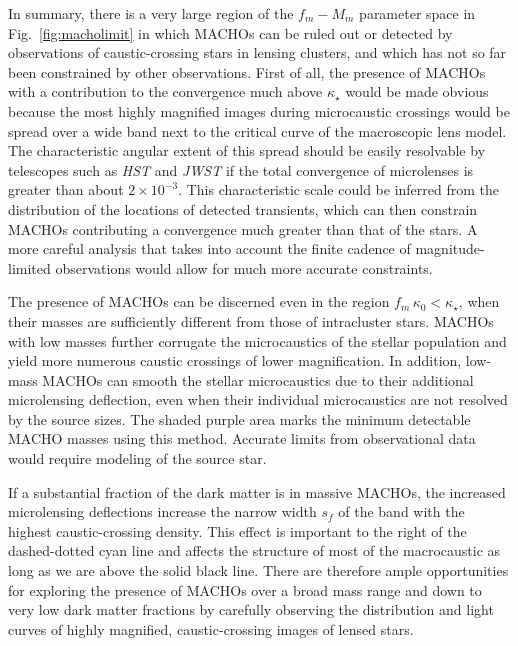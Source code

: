 \documentclass{aastex6}
\newcommand{\reffig}[1]{Fig.~\ref{fig:#1}}
\begin{document}
  In summary, there is a very large region of the $f_m - M_m$
parameter space in \reffig{macholimit} in which MACHOs can be ruled out or
detected by observations of caustic-crossing stars in lensing
clusters, and which has not so far been constrained by other observations.
First of all, the presence of MACHOs with a contribution to the
convergence much above $\kappa_\star$ would be made obvious because the
most highly magnified images during microcaustic crossings would be spread
over a wide band next to the critical curve of the macroscopic lens model. The characteristic angular extent of this spread should be easily resolvable by telescopes such as {\em HST} and {\em JWST} if the total convergence of microlenses is greater than about $2 \times 10^{-3}$. This characteristic scale could be inferred from the distribution of the locations of detected transients, which can then constrain MACHOs contributing a convergence much greater than that of the stars. A more careful analysis that takes into account the finite cadence of magnitude-limited observations would allow for much more accurate constraints.

The presence of MACHOs can be discerned even in the region $f_m\, \kappa_0 < \kappa_\star$, when their masses are sufficiently different from those of intracluster stars. MACHOs with low masses further corrugate the microcaustics of the stellar population and yield more numerous caustic crossings of lower magnification. In addition, low-mass MACHOs can smooth the stellar microcaustics due to their additional microlensing deflection, even when their individual microcaustics are not resolved by the source sizes. The shaded purple area marks the minimum detectable MACHO masses using this method. Accurate limits from observational data would require modeling of the source star.

If a substantial fraction of the dark matter is in massive MACHOs, the increased microlensing deflections increase the narrow width $s_f$ of the band with the highest caustic-crossing density. This effect is important to the right of the dashed-dotted cyan line and affects the structure of most of the macrocaustic as long as we are above the solid black line. There are therefore ample opportunities for exploring the presence of MACHOs over a broad mass range and down to very low dark matter fractions by carefully observing the distribution and light curves of highly magnified, caustic-crossing images of lensed stars.
\end{document}
